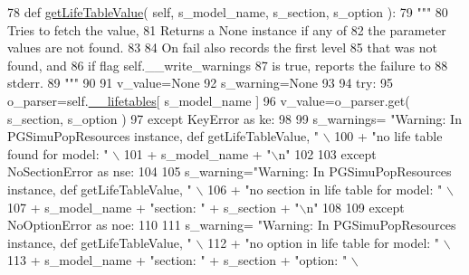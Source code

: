 \begin{DoxyCode}
78     \textcolor{keyword}{def }\hyperlink{classnegui_1_1pgsimupopresources_1_1PGSimuPopResources_a37fa2c7b4da84a2281231943a8e61c6c}{getLifeTableValue}( self, s\_model\_name, s\_section, s\_option ):
79         \textcolor{stringliteral}{"""}
80 \textcolor{stringliteral}{        Tries to fetch the value, }
81 \textcolor{stringliteral}{        Returns a None instance if any of }
82 \textcolor{stringliteral}{        the parameter values are not found.}
83 \textcolor{stringliteral}{}
84 \textcolor{stringliteral}{        On fail also records the first level}
85 \textcolor{stringliteral}{        that was not found, and}
86 \textcolor{stringliteral}{        if flag self.\_\_write\_warnings}
87 \textcolor{stringliteral}{        is true, reports the failure to}
88 \textcolor{stringliteral}{        stderr.}
89 \textcolor{stringliteral}{        """}
90 
91         v\_value=\textcolor{keywordtype}{None}
92         s\_warning=\textcolor{keywordtype}{None}
93 
94         \textcolor{keywordflow}{try}:
95             o\_parser=self.\hyperlink{classnegui_1_1pgsimupopresources_1_1PGSimuPopResources_ae32ca7cc4b6a1563734a82da0a0c6608}{\_\_lifetables}[ s\_model\_name ]
96             v\_value=o\_parser.get( s\_section, s\_option )
97         \textcolor{keywordflow}{except} KeyError \textcolor{keyword}{as} ke:
98 
99             s\_warnings= \textcolor{stringliteral}{"Warning: In PGSimuPopResources instance, def getLifeTableValue, "} \(\backslash\)
100                     + \textcolor{stringliteral}{"no life table found for model: "}  \(\backslash\)
101                     + s\_model\_name + \textcolor{stringliteral}{"\(\backslash\)n"} 
102 
103         \textcolor{keywordflow}{except} NoSectionError \textcolor{keyword}{as} nse:
104 
105             s\_warning=\textcolor{stringliteral}{"Warning: In PGSimuPopResources instance, def getLifeTableValue, "} \(\backslash\)
106                     + \textcolor{stringliteral}{"no section in life table for model: "}  \(\backslash\)
107                     + s\_model\_name + \textcolor{stringliteral}{"section: "} + s\_section + \textcolor{stringliteral}{"\(\backslash\)n"} 
108 
109         \textcolor{keywordflow}{except} NoOptionError \textcolor{keyword}{as} noe:
110 
111             s\_warning= \textcolor{stringliteral}{"Warning: In PGSimuPopResources instance, def getLifeTableValue, "} \(\backslash\)
112                     + \textcolor{stringliteral}{"no option in life table for model: "}  \(\backslash\)
113                     + s\_model\_name + \textcolor{stringliteral}{"section: "} + s\_section + \textcolor{stringliteral}{"option: "} \(\backslash\)

\end{DoxyCode}
